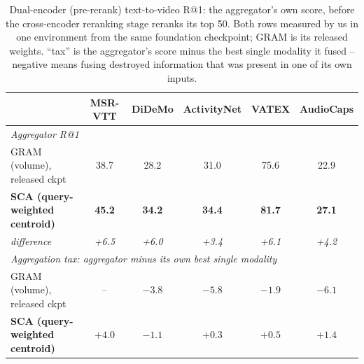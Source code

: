 %
%
\begin{table}[t]
\centering
\caption{Dual-encoder (pre-rerank) text-to-video R@1: the aggregator's own score, before the
cross-encoder reranking stage reranks its top 50. Both rows measured by us in one environment
from the same foundation checkpoint; GRAM is its released weights. ``tax'' is the aggregator's
score minus the best single modality it fused -- negative means fusing destroyed information
that was present in one of its own inputs.}
\label{tab:aggregator}
\small
\setlength{\tabcolsep}{5pt}
\begin{tabular}{lccccc}
\toprule
& MSR-VTT & DiDeMo & ActivityNet & VATEX & AudioCaps \\
\midrule
\multicolumn{6}{l}{\emph{Aggregator R@1}} \\
GRAM (volume), released ckpt & 38.7 & 28.2 & 31.0 & 75.6 & 22.9 \\
\textbf{SCA (query-weighted centroid)} & \textbf{45.2} & \textbf{34.2} & \textbf{34.4} & \textbf{81.7} & \textbf{27.1} \\
\emph{difference} & \emph{+6.5} & \emph{+6.0} & \emph{+3.4} & \emph{+6.1} & \emph{+4.2} \\
\midrule
\multicolumn{6}{l}{\emph{Aggregation tax: aggregator minus its own best single modality}} \\
GRAM (volume), released ckpt & -- & $-3.8$ & $-5.8$ & $-1.9$ & $-6.1$ \\
\textbf{SCA (query-weighted centroid)} & $+4.0$ & $-1.1$ & $+0.3$ & $+0.5$ & $+1.4$ \\
\bottomrule
\end{tabular}
\end{table}

